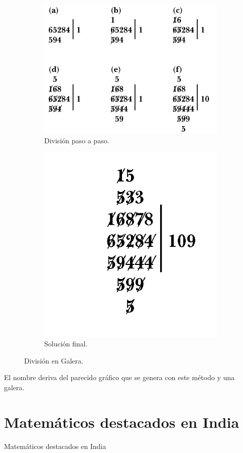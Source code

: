 \documentclass[compress, aspectratio=169]{beamer} %
\begin{document}
		\begin{frame}
			\begin{figure}
			\centering
				\begin{subfigure}{.5\textwidth}
					\centering
					\includegraphics[width = .75\linewidth]{Galley_Method3.png}
					\caption{División paso a paso.}
				\end{subfigure}%
				\begin{subfigure}{.5\textwidth}
					\centering
					\includegraphics[width = .5\linewidth]{Galley_Method4.png}
					\caption{Solución final.}
				\end{subfigure}
				\caption{División en Galera.}
			\end{figure}
			
			\pause
			
			El nombre deriva del parecido gráfico que se genera con este método y una galera.
		\end{frame}

\section{Matemáticos destacados en India}
	\begin{frame}
		\Huge{\centerline{Matemáticos destacados en India}}
	\end{frame}
\end{document}
